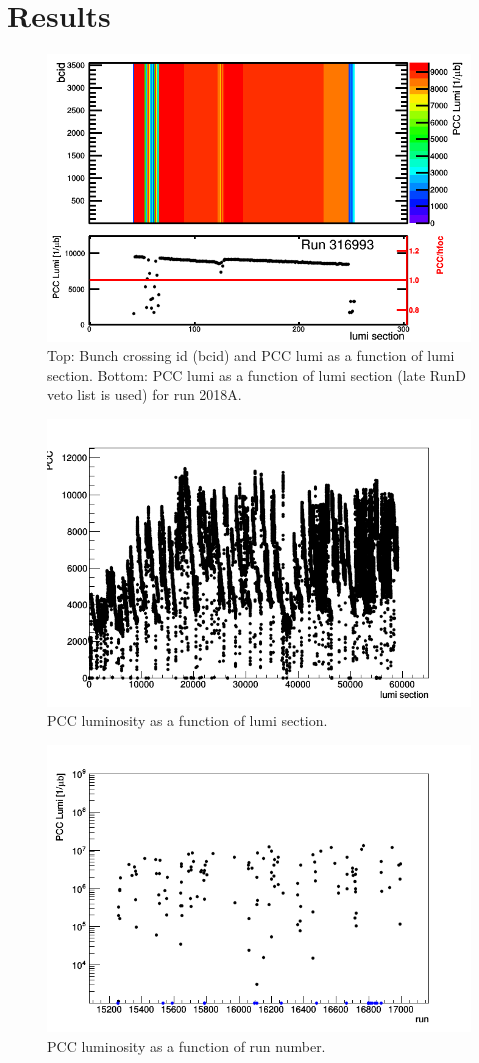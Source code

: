 \section{Results}
\label{sec:results}


\begin{figure}[H]
  \centering
  \includegraphics[width=0.5\columnwidth]{./316993.png}
  \caption{Top: Bunch crossing id (bcid) and PCC lumi as a function of lumi section. Bottom: PCC lumi as a function of lumi section (late RunD veto list is used) for run 2018A.}
  \label{fig:CMS}
\end{figure}


\begin{figure}[H]
  \centering
  \includegraphics[width=0.5\columnwidth]{./ls_lumi.png}
  \caption{PCC luminosity as a function of lumi section.}
  \label{fig:CMS}
\end{figure}


\begin{figure}[H]
  \centering
  \includegraphics[width=0.5\columnwidth]{./runs.png}
  \caption{PCC luminosity as a function of run number.}
  \label{fig:CMS}
\end{figure}


